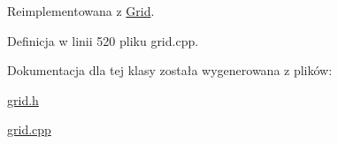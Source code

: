 Reimplementowana z \hyperlink{class_grid_ac0cf78c28206fd44fba21c5a91d0a0e0}{Grid}.



Definicja w linii 520 pliku grid.\+cpp.



Dokumentacja dla tej klasy została wygenerowana z plików\+:\begin{DoxyCompactItemize}
\item 
\hyperlink{grid_8h}{grid.\+h}\item 
\hyperlink{grid_8cpp}{grid.\+cpp}\end{DoxyCompactItemize}
